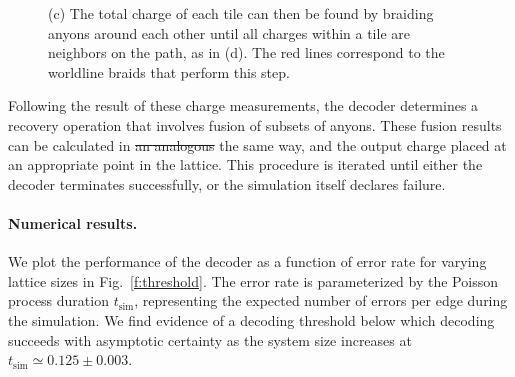 \documentclass[aps, prl, letterpaper, twocolumn, superscriptaddress, notitlepage, 10pt]{revtex4-1}
\newcommand{\Fref}[1]{Fig.~\ref{#1}}
\begin{document}
\begin{figure}[t!]
\begin{center}
{%
(c) The total charge of each tile can then be found 
by braiding anyons around each other until all charges within 
a tile are neighbors on the path, as in (d).  
The red lines correspond to the worldline braids that perform this step.
}
\label{f:syndrome}
\end{center}
\vspace{-10pt}
\end{figure}

Following the result of these charge measurements, the decoder determines 
a recovery operation that involves fusion of subsets of anyons. 
These fusion results can be calculated in \sout{an analogous} the same way, 
and the output charge placed at an appropriate point in the lattice. 
This procedure is iterated until either the decoder terminates successfully, 
or the simulation itself declares failure.


\paragraph{Numerical results.}

We plot the performance of the decoder as a function of error rate for varying lattice sizes in 
\Fref{f:threshold}. 
The error rate is parameterized by the Poisson process duration $t_{\mathrm{sim}}$, representing the expected number of errors per edge during the simulation. 
We find evidence of a decoding threshold below which decoding succeeds with asymptotic 
certainty as the system size increases at $t_{\mathrm{sim}}\simeq 0.125 \pm 0.003$.
\end{document}
